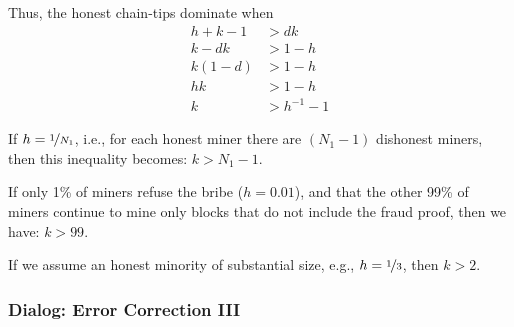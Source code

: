Thus, the honest chain-tips dominate when
\begin{align*}
    h + k - 1 &> dk \\
    k - dk &> 1 - h \\
    k(1 - d) &> 1-h \\
    h k &> 1-h \\
    k &> h^{-1} - 1
\end{align*}

If $h = \nicefrac{1}{N_1}$, i.e., for each honest miner there are $(N_1 - 1)$ dishonest miners, then this inequality becomes: $k > N_1 - 1$.

If only 1\% of miners refuse the bribe ($h = 0.01$), and that the other 99\% of miners continue to mine only blocks that do not include the fraud proof, then we have: $k > 99$.

If we assume an honest minority of substantial size, e.g., $h = \nicefrac{1}{3}$, then $k > 2$.



%

\subsubsection{Dialog: Error Correction III}



